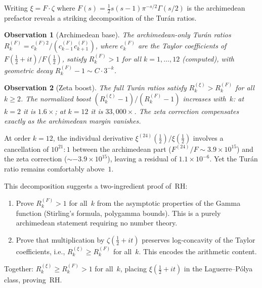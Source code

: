 \documentclass[11pt,a4paper]{article}
\newtheorem{observation}{Observation}[section]
\begin{document}
Writing $\xi = F \cdot \zeta$ where $F(s) = \tfrac{1}{2}s(s-1)\pi^{-s/2}\Gamma(s/2)$ is the archimedean prefactor reveals a striking decomposition of the Tur\'an ratios.

\begin{observation}[Archimedean base]\label{obs:Fturan}
The archimedean-only Tur\'an ratios $R_k^{(F)} = c_k^{(F)2}/(c_{k-1}^{(F)} c_{k+1}^{(F)})$, where $c_k^{(F)}$ are the Taylor coefficients of $F(\tfrac{1}{2}+it)/F(\tfrac{1}{2})$, satisfy $R_k^{(F)} > 1$ for all $k = 1, \ldots, 12$ (computed), with geometric decay $R_k^{(F)} - 1 \sim C \cdot 3^{-k}$.
\end{observation}

\begin{observation}[Zeta boost]\label{obs:zetaboost}
The full Tur\'an ratios satisfy $R_k^{(\xi)} > R_k^{(F)}$ for all $k \geq 2$. The normalized boost $(R_k^{(\xi)} - 1)/(R_k^{(F)} - 1)$ \emph{increases} with~$k$: at $k = 2$ it is $1.6\times$; at $k = 12$ it is $33{,}000\times$. The zeta correction compensates exactly as the archimedean margin vanishes.
\end{observation}

At order $k = 12$, the individual derivative $\xi^{(24)}(\tfrac{1}{2})/\xi(\tfrac{1}{2})$ involves a cancellation of $10^{21}:1$ between the archimedean part ($F^{(24)}/F \sim 3.9 \times 10^{15}$) and the zeta correction ($\sim -3.9 \times 10^{15}$), leaving a residual of $1.1 \times 10^{-6}$. Yet the Tur\'an ratio remains comfortably above~$1$.

This decomposition suggests a two-ingredient proof of~RH:
\begin{enumerate}
\item[\textbf{Step~1.}] Prove $R_k^{(F)} > 1$ for all~$k$ from the asymptotic properties of the Gamma function (Stirling's formula, polygamma bounds). This is a purely archimedean statement requiring no number theory.
\item[\textbf{Step~2.}] Prove that multiplication by $\zeta(\tfrac{1}{2} + it)$ preserves log-concavity of the Taylor coefficients, i.e., $R_k^{(\xi)} \geq R_k^{(F)}$ for all~$k$. This encodes the arithmetic content.
\end{enumerate}
Together: $R_k^{(\xi)} \geq R_k^{(F)} > 1$ for all~$k$, placing $\xi(\tfrac{1}{2}+it)$ in the Laguerre--P\'olya class, proving~RH.
\end{document}
